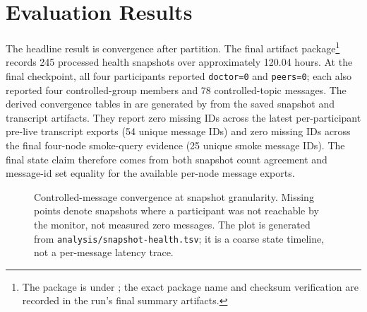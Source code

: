 \documentclass[11pt,a4paper,twocolumn]{article}
\begin{document}
\section{Evaluation Results}
\label{sec:results}

The headline result is convergence after partition. The final artifact
package\footnote{The package is under ;
the exact package name and checksum verification are recorded in the run's
final summary artifacts.} records 245 processed health snapshots over
approximately 120.04 hours. At the final checkpoint, all four participants
reported \texttt{doctor=0} and \texttt{peers=0}; each also reported four
controlled-group members and 78 controlled-topic messages. The derived
convergence tables in  are generated by
 from the saved snapshot and
transcript artifacts. They report zero missing IDs across the latest
per-participant pre-live transcript exports (54 unique message IDs) and zero
missing IDs across the final four-node smoke-query evidence (25 unique smoke
message IDs). The final state claim therefore comes from both snapshot count
agreement and message-id set equality for the available per-node message
exports.

\begin{figure}[t]
\centering
{}
\caption{Controlled-message convergence at snapshot granularity. Missing
points denote snapshots where a participant was not reachable by the monitor,
not measured zero messages. The plot is generated from
\texttt{analysis/snapshot-health.tsv}; it is a coarse state timeline, not a
per-message latency trace.}
\label{fig:convergence-timeline}
\end{figure}
\end{document}
